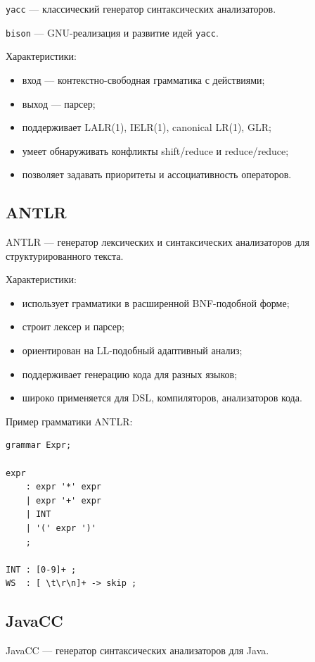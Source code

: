 \documentclass[12pt,a4paper]{article}
\begin{document}
\texttt{yacc} --- классический генератор синтаксических анализаторов.

\texttt{bison} --- GNU-реализация и развитие идей \texttt{yacc}.

Характеристики:
\begin{itemize}
    \item вход --- контекстно-свободная грамматика с действиями;
    \item выход --- парсер;
    \item поддерживает LALR(1), IELR(1), canonical LR(1), GLR;
    \item умеет обнаруживать конфликты shift/reduce и reduce/reduce;
    \item позволяет задавать приоритеты и ассоциативность операторов.
\end{itemize}

\subsection{ANTLR}

ANTLR --- генератор лексических и синтаксических анализаторов для структурированного текста.

Характеристики:
\begin{itemize}
    \item использует грамматики в расширенной BNF-подобной форме;
    \item строит лексер и парсер;
    \item ориентирован на LL-подобный адаптивный анализ;
    \item поддерживает генерацию кода для разных языков;
    \item широко применяется для DSL, компиляторов, анализаторов кода.
\end{itemize}

Пример грамматики ANTLR:

\begin{lstlisting}
grammar Expr;

expr
    : expr '*' expr
    | expr '+' expr
    | INT
    | '(' expr ')'
    ;

INT : [0-9]+ ;
WS  : [ \t\r\n]+ -> skip ;
\end{lstlisting}

\subsection{JavaCC}

JavaCC --- генератор синтаксических анализаторов для Java.
\end{document}
